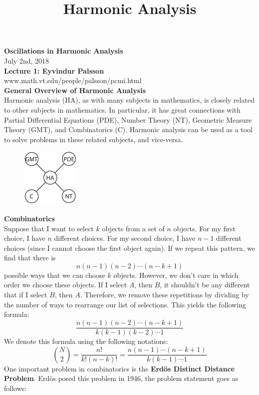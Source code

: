 \documentclass[12pt]{article}
\title{Harmonic Analysis}
\begin{document}
\noindent \textbf{Oscillations in Harmonic Analysis} \\
\noindent July 2nd, 2018 \\
\noindent \textbf{Lecture 1: Eyvindur Palsson} \\
\noindent www.math.vt.edu/people/palsson/pcmi.html \\

\noindent \textbf{General Overview of Harmonic Analysis} \\
Harmonic analysis (HA), as with many subjects in mathematics, is closely related to other subjects in mathematics. In particular, it has great connections with Partial Differential Equations (PDE), Number Theory (NT), Geometric Measure Theory (GMT), and Combinatorics (C). Harmonic analysis can be used as a tool to solve problems in these related subjects, and vice-versa. \\

\begin{figure}[H]
\centering
\includegraphics[width=0.25\textwidth]{1Overview.pdf}
\caption{}
\end{figure}

\noindent \textbf{Combinatorics} \\
Suppose that I want to select $k$ objects from a set of $n$ objects. For my first choice, I have $n$ different choices. For my second choice, I have $n-1$ different choices (since I cannot choose the first object again). If we repeat this pattern, we find that there is 
$$n(n-1)(n-2) \cdots (n-k+1)$$
possible ways that we can choose $k$ objects. However, we don't care in which order we choose these objects. If I select $A$, then $B$, it shouldn't be any different that if I select $B$, then $A$. Therefore, we remove these repetitions by dividing by the number of ways to rearrange our list of selections. This yields the following formula:
$$\frac{n(n-1)(n-2) \cdots (n-k+1)}{k(k-1)(k-2)\cdots 1}$$
\noindent We denote this formula using the following notations: \\
$$ \binom{N}{2} = \frac{n!}{k!(n-k)!} = \frac{n(n-1) \cdots (n-k+1)}{k(k-1)\cdots 1}$$
\noindent One important problem in combinatorics is the \textbf{Erd\"os Distinct Distance Problem}. Erd\"os posed this problem in 1946, the problem statement goes as follows: \\
\end{document}
